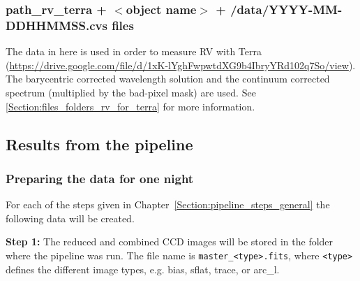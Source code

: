 \documentclass[10pt,a4paper]{article}
\begin{document}
\subsubsection{path\_rv\_terra + $<$object name$>$ + /data/YYYY-MM-DDHHMMSS.cvs files}
The data in here is used in order to measure RV with Terra (\url{https://drive.google.com/file/d/1xK-lYghFwpwtdXG9b4IbryYRd102q7So/view}). The barycentric corrected wavelength solution and the continuum corrected spectrum (multiplied by the bad-pixel mask) are used. See \ref{Section:files_folders_rv_for_terra} for more information.

\subsection{Results from the pipeline}

\subsubsection{Preparing the data for one night}
\label{section:results_pipeline}
For each of the steps given in Chapter~\ref{Section:pipeline_steps_general} the following data will be created.

\noindent \textbf{Step 1:} The reduced and combined CCD images will be stored in the folder where the pipeline was run. The file name is \verb|master_<type>.fits|, where \verb|<type>| defines the different image types, e.g. bias, sflat, trace, or arc\_l.
\end{document}
